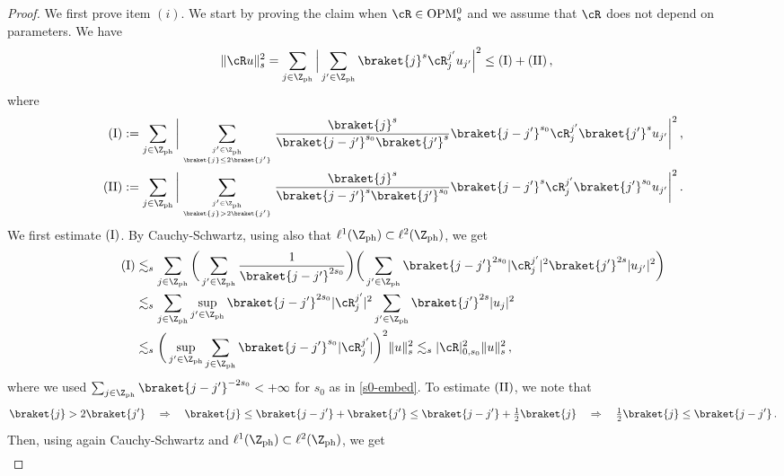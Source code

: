\documentclass[a4paper,reqno,10pt]{article}
\newcommand{\OpM}{{\rm O}{\rm P}{\rm M}}
\begin{document}
\begin{proof}
We first prove item $(i)$. We start by proving the claim when $\cR \in \OpM_{s}^{0}$ and we assume that $\cR$ does not depend on parameters. We have
\begin{align}
   \| \cR u \|_{s}^2 &   =\sum_{j\in \Z_{\rm ph}}  \Big| \sum_{j'\in \Z_{\rm ph}} \braket{j}^{s} \cR_{j}^{j'} u_{j'} \Big|^2  \leq ({\rm I}) + ({\rm II})  \,,
\end{align}
where
\begin{align}
    ({\rm I}) &  :=   \sum_{j\in \Z_{\rm ph}}  \bigg| \sum_{j'\in \Z_{\rm ph} \atop  \braket{j}\leq 2 \braket{j'} } \frac{\braket{j}^s}{\braket{j-j'}^{s_0} \braket{j'}^s} \braket{j-j'}^{s_0}\cR_{j}^{j'} \braket{j'}^{s} u_{j'} \bigg|^2  \,,  \\
    ({\rm II}) &  :=   \sum_{j\in \Z_{\rm ph}}  \bigg| \sum_{j'\in \Z_{\rm ph}\atop \braket{j} >  2 \braket{j'}} \frac{\braket{j}^s}{\braket{j-j'}^{s} \braket{j'}^{s_0}} \braket{j-j'}^{s}\cR_{j}^{j'} \braket{j'}^{s_0} u_{j'} \bigg|^2 \,. \label{bas}
\end{align}
We first estimate $({\rm I})$.  By Cauchy-Schwartz, using also that $\ell^1(\Z_{\rm ph}) \subset \ell^2(\Z_{\rm ph})$, we get
\begin{align}
    ({\rm I}) & \lesssim_{s}  \sum_{j\in \Z_{\rm ph}}\bigg(  \sum_{j'\in \Z_{\rm ph}} \frac{1}{\braket{j-j'}^{2s_0}} \bigg) \bigg(  \sum_{j'\in \Z_{\rm ph}} \braket{j-j'}^{2s_0}|\cR_{j}^{j'}|^2 \braket{j'}^{2s} |u_{j'}|^{2} \bigg) \\
    & \lesssim_{s} \sum_{j\in \Z_{\rm ph}} \sup_{j'\in\Z_{\rm ph}} \braket{j-j'}^{2s_0} |\cR_{j}^{j'}|^2 \sum_{j'\in\Z_{\rm ph}} \braket{j'}^{2s} |u_j|^2 \\
    & \lesssim_{s} \bigg( \sup_{j'\in \Z_{\rm ph}} \sum_{j\in\Z_{\rm ph}} \braket{j-j'}^{s_0} |\cR_{j}^{j'}| \bigg)^2 \| u \|_{s}^2 \lesssim_{s} |\cR|_{0,s_0}^{2}\| u \|_{s}^2 \,, \label{I}
\end{align}
where we used $\sum_{j\in \Z_{\rm ph}}\braket{j-j'}^{-2s_0}<+\infty$ for $s_0$ as in \eqref{s0-embed}. To estimate $({\rm II})$, we note that
\begin{equation}
    \braket{j} > 2 \braket{j'} \quad \Rightarrow \quad \braket{j}\leq \braket{j-j'} + \braket{j'} \leq \braket{j-j'} + \tfrac12 \braket{j} \quad \Rightarrow \quad  \tfrac12 \braket{j} \leq \braket{j-j'} \,.
\end{equation}
Then, using again Cauchy-Schwartz and $\ell^1(\Z_{\rm ph}) \subset \ell^2(\Z_{\rm ph})$, we get
\begin{align}

\end{align}
\end{proof}
\end{document}

